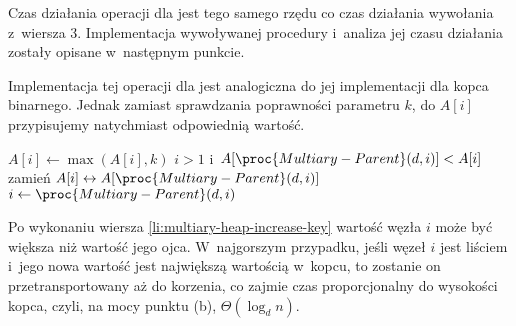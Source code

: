 Czas działania operacji  dla  jest tego samego rzędu co czas działania wywołania z~wiersza 3.
Implementacja wywoływanej procedury  i~analiza jej czasu działania zostały opisane w~następnym punkcie.

\subproblem %
Implementacja tej operacji dla  jest analogiczna do jej implementacji dla kopca binarnego.
Jednak zamiast sprawdzania poprawności parametru $k$, do $A[i]$ przypisujemy natychmiast odpowiednią wartość.
\begin{codebox}
\li	$A[i]\gets\max(A[i],k)$ \label{li:multiary-heap-increase-key}
\li	\While $i>1$ i~$A[\proc{Multiary-Parent}(d,i)]<A[i]$
\li		\Do zamień $A[i]\leftrightarrow A[\proc{Multiary-Parent}(d,i)]$
\li			$i\gets\proc{Multiary-Parent}(d,i)$
		\End
\end{codebox}

Po wykonaniu wiersza \ref{li:multiary-heap-increase-key} wartość węzła $i$ może być większa niż wartość jego ojca.
W~najgorszym przypadku, jeśli węzeł $i$ jest liściem i~jego nowa wartość jest największą wartością w~kopcu, to zostanie on przetransportowany aż do korzenia, co zajmie czas proporcjonalny do wysokości kopca, czyli, na mocy punktu (b), $\Theta(\log_dn)$.
